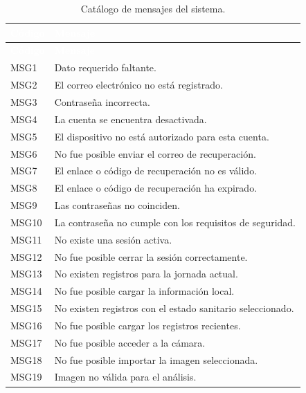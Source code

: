 \begin{longtable}{|p{2.5cm}|p{10.5cm}|}
\caption{Catálogo de mensajes del sistema.}
\label{tab:catalogoMensajes} \\

\hline
\rowcolor{black}
\textcolor{white}{\textbf{Código}} & \textcolor{white}{\textbf{Mensaje}} \\ \hline
\endfirsthead

\hline
\rowcolor{black}
\textcolor{white}{\textbf{Código}} & \textcolor{white}{\textbf{Mensaje}} \\ \hline
\endhead

\hline
\endfoot

\hline
\endlastfoot

MSG1 & Dato requerido faltante. \\ \hline
MSG2 & El correo electrónico no está registrado. \\ \hline
MSG3 & Contraseña incorrecta. \\ \hline
MSG4 & La cuenta se encuentra desactivada. \\ \hline
MSG5 & El dispositivo no está autorizado para esta cuenta. \\ \hline
MSG6 & No fue posible enviar el correo de recuperación. \\ \hline
MSG7 & El enlace o código de recuperación no es válido. \\ \hline
MSG8 & El enlace o código de recuperación ha expirado. \\ \hline
MSG9 & Las contraseñas no coinciden. \\ \hline
MSG10 & La contraseña no cumple con los requisitos de seguridad. \\ \hline
MSG11 & No existe una sesión activa. \\ \hline
MSG12 & No fue posible cerrar la sesión correctamente. \\ \hline
MSG13 & No existen registros para la jornada actual. \\ \hline
MSG14 & No fue posible cargar la información local. \\ \hline
MSG15 & No existen registros con el estado sanitario seleccionado. \\ \hline
MSG16 & No fue posible cargar los registros recientes. \\ \hline
MSG17 & No fue posible acceder a la cámara. \\ \hline
MSG18 & No fue posible importar la imagen seleccionada. \\ \hline
MSG19 & Imagen no válida para el análisis. \\ \hline

\end{longtable}

